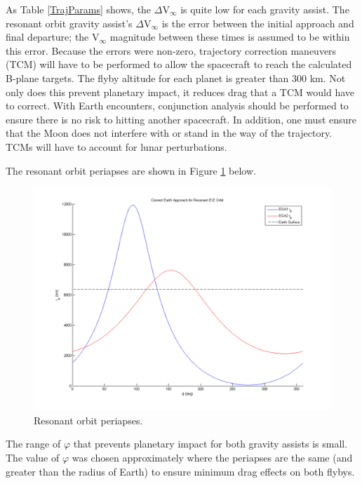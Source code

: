 \documentclass[]{aiaa-tc}%
\begin{document}
\begin{table}[H]
\begin{tabular}{|c|c|c|l|}
\end{tabular}
\end{table}

As Table \ref{TrajParams} shows, the $\Delta$V$_\infty$ is quite low for each gravity assist. The resonant orbit gravity assist's $\Delta$V$_\infty$ is the error between the initial approach and final departure; the V$_\infty$ magnitude between these times is assumed to be within this error. Because the errors were non-zero, trajectory correction maneuvers (TCM) will have to be performed to allow the spacecraft to reach the calculated B-plane targets. The flyby altitude for each planet is greater than 300 km. Not only does this prevent planetary impact, it reduces drag that a TCM would have to correct. With Earth encounters, conjunction analysis should be performed to ensure there is no risk to hitting another spacecraft. In addition, one must ensure that the Moon does not interfere with or stand in the way of the trajectory. TCMs will have to account for lunar perturbations.
	
	\vspace{5 mm}

The resonant orbit periapses are shown in Figure \ref{fig:reso} below.
	\begin{figure}[H]
		\centering
			\includegraphics[width = 18cm]{../PCP/VEEJ/PhiVsRp.png}
		\caption{Resonant orbit periapses. }
		\label{fig:reso}
	\end{figure}	

The range of $\varphi$ that prevents planetary impact for both gravity assists is small. The value of $\varphi$ was chosen approximately where the periapses are the same (and greater than the radius of Earth) to ensure minimum drag effects on both flybys. 
	
\end{document}
